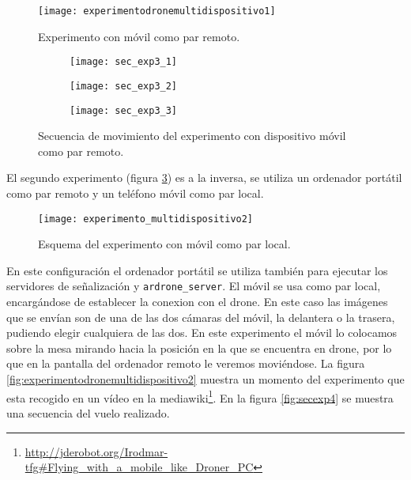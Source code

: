 \begin{figure}[h!]
\centering
\texttt{[image: experimentodronemultidispositivo1]}
\caption{Experimento con móvil como par remoto.}
\label{fig:experimentodronemultidispositivo1}
\end{figure}


\begin{figure}[h!]
\centering
  \begin{subfigure}[]{48mm}
    \texttt{[image: sec\_exp3\_1]}
  \end{subfigure}
  \hspace{1pt}
  \begin{subfigure}[]{48mm}
    \texttt{[image: sec\_exp3\_2]}
  \end{subfigure}
    \hspace{1pt}
    \begin{subfigure}[]{48mm}
    \texttt{[image: sec\_exp3\_3]}
  \end{subfigure}
    \caption{Secuencia de movimiento del experimento con dispositivo móvil como par remoto.}
  \label{fig:secexp3}
\end{figure}


\newpage
El segundo experimento (figura \ref{fig:esquemaexperimentomultidispositivo2}) es a la inversa, se utiliza un ordenador portátil como par remoto y un teléfono móvil como par local.

\begin{figure}[h!]
\centering
\texttt{[image: experimento\_multidispositivo2]}
\caption{Esquema del experimento con móvil como par local.}
\label{fig:esquemaexperimentomultidispositivo2}
\end{figure}

En este configuración el ordenador portátil se utiliza también para ejecutar los servidores de señalización y \texttt{ardrone\_server}. El móvil se usa como par local, encargándose de establecer la conexion con el drone. En este caso las imágenes que se envían son de una de las dos cámaras del móvil, la delantera o la trasera, pudiendo elegir cualquiera de las dos. En este experimento el móvil lo colocamos sobre la mesa mirando hacia la posición en la que se encuentra en drone, por lo que en la pantalla del ordenador remoto le veremos moviéndose. La figura \ref{fig:experimentodronemultidispositivo2} muestra un momento del experimento que esta recogido en un vídeo en la mediawiki\footnote{\url{http://jderobot.org/Irodmar-tfg#Flying_with_a_mobile_like_Droner_PC}}. En la figura \ref{fig:secexp4} se muestra una secuencia del vuelo realizado.\\

